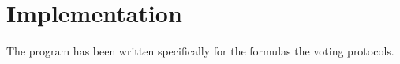 \chapter{Implementation}
\label{04}


The program has been written specifically for the formulas the voting protocols. 




